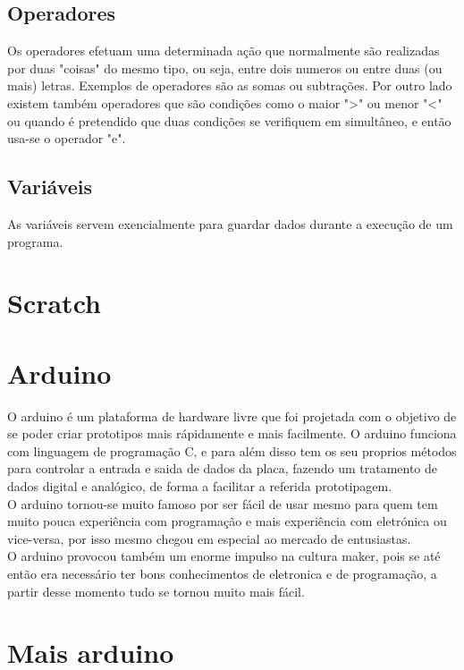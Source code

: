 \documentclass{article}
\begin{document}
\subsection{Operadores}
Os operadores efetuam uma determinada ação que normalmente são realizadas por duas "coisas" do mesmo tipo, ou seja, entre dois numeros ou entre duas (ou mais) letras. Exemplos de operadores são as somas ou subtrações. Por outro lado existem também operadores que são condições como o maior ">" ou menor "<" ou quando é pretendido que duas condições se verifiquem em simultâneo, e então usa-se o operador "e".

\subsection{Variáveis}
As variáveis servem exencialmente para guardar dados durante a execução de um programa.

\section{Scratch}

\section{Arduino}
O arduino é um plataforma de hardware livre que foi projetada com o objetivo de se poder criar prototipos mais rápidamente e mais facilmente. O arduino funciona com linguagem de programação C, e para além disso tem os seu proprios métodos para controlar a entrada e saida de dados da placa, fazendo um tratamento de dados digital e analógico, de forma a facilitar a referida prototipagem.\newline \\
O arduino tornou-se muito famoso por ser fácil de usar mesmo para quem tem muito pouca experiência com programação e mais experiência com eletrónica ou vice-versa, por isso mesmo chegou em especial ao mercado de entusiastas.\newline \\
O arduino provocou também um enorme impulso na cultura maker, pois se até então era necessário ter bons conhecimentos de eletronica e de programação, a partir desse momento tudo se tornou muito mais fácil.\newline \\
%

\section{Mais arduino}
\end{document}
